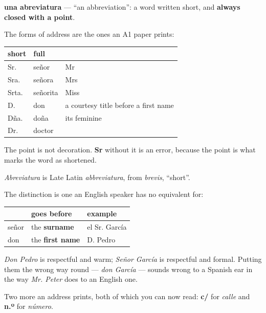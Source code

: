 \begin{cousinweb}
\textbf{una abreviatura} — \textquotedblleft{}an abbreviation\textquotedblright{}: a word written short, and \textbf{always closed with a point}.

The forms of address are the ones an A1 paper prints:

\noindent
\begin{tabularx}{\linewidth}{@{}>{\raggedright\arraybackslash}X>{\raggedright\arraybackslash}X>{\raggedright\arraybackslash}X@{}}
\toprule
\textbf{short} & \textbf{full} & \textbf{} \\
\midrule
Sr. & señor & Mr \\
Sra. & señora & Mrs \\
Srta. & señorita & Miss \\
D. & don & a courtesy title before a first name \\
Dña. & doña & its feminine \\
Dr. & doctor &  \\
\bottomrule
\end{tabularx}

The point is not decoration. \textbf{Sr} without it is an error, because the point is what marks the word as shortened.

\emph{Abreviatura} is Late Latin \emph{abbreviatura}, from \emph{brevis}, \textquotedblleft{}short\textquotedblright{}.
\end{cousinweb}

\begin{grammarlens}[title={Grammar Lens: don and señor are not the same word}]
The distinction is one an English speaker has no equivalent for:

\noindent
\begin{tabularx}{\linewidth}{@{}>{\raggedright\arraybackslash}X>{\raggedright\arraybackslash}X>{\raggedright\arraybackslash}X@{}}
\toprule
\textbf{} & \textbf{goes before} & \textbf{example} \\
\midrule
señor & the \textbf{surname} & el Sr. García \\
don & the \textbf{first name} & D. Pedro \\
\bottomrule
\end{tabularx}

\emph{Don Pedro} is respectful and warm; \emph{Señor García} is respectful and formal. Putting them the wrong way round — \emph{don García} — sounds wrong to a Spanish ear in the way \emph{Mr. Peter} does to an English one.

Two more an address prints, both of which you can now read: \textbf{c/} for \emph{calle} and \textbf{n.º} for \emph{número}.
\end{grammarlens}

